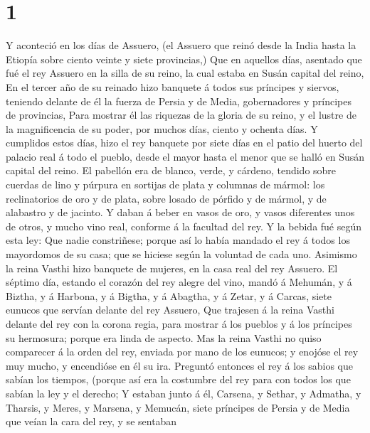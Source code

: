 \hypertarget{section}{%
\section{1}\label{section}}

 Y aconteció en los días de Assuero, (el Assuero que reinó
desde la India hasta la Etiopía sobre ciento veinte y siete provincias,)
 Que en aquellos días, asentado que fué el rey Assuero en la
silla de su reino, la cual estaba en Susán capital del reino,
 En el tercer año de su reinado hizo banquete á todos sus
príncipes y siervos, teniendo delante de él la fuerza de Persia y de
Media, gobernadores y príncipes de provincias,  Para mostrar
él las riquezas de la gloria de su reino, y el lustre de la
magnificencia de su poder, por muchos días, ciento y ochenta días.
 Y cumplidos estos días, hizo el rey banquete por siete días
en el patio del huerto del palacio real á todo el pueblo, desde el mayor
hasta el menor que se halló en Susán capital del reino.  El
pabellón era de blanco, verde, y cárdeno, tendido sobre cuerdas de lino
y púrpura en sortijas de plata y columnas de mármol: los reclinatorios
de oro y de plata, sobre losado de pórfido y de mármol, y de alabastro y
de jacinto.  Y daban á beber en vasos de oro, y vasos
diferentes unos de otros, y mucho vino real, conforme á la facultad del
rey.  Y la bebida fué según esta ley: Que nadie constriñese;
porque así lo había mandado el rey á todos los mayordomos de su casa;
que se hiciese según la voluntad de cada uno.  Asimismo la
reina Vasthi hizo banquete de mujeres, en la casa real del rey Assuero.
 El séptimo día, estando el corazón del rey alegre del
vino, mandó á Mehumán, y á Biztha, y á Harbona, y á Bigtha, y á Abagtha,
y á Zetar, y á Carcas, siete eunucos que servían delante del rey
Assuero,  Que trajesen á la reina Vasthi delante del rey
con la corona regia, para mostrar á los pueblos y á los príncipes su
hermosura; porque era linda de aspecto.  Mas la reina
Vasthi no quiso comparecer á la orden del rey, enviada por mano de los
eunucos; y enojóse el rey muy mucho, y encendióse en él su ira.
 Preguntó entonces el rey á los sabios que sabían los
tiempos, (porque así era la costumbre del rey para con todos los que
sabían la ley y el derecho;  Y estaban junto á él, Carsena,
y Sethar, y Admatha, y Tharsis, y Meres, y Marsena, y Memucán, siete
príncipes de Persia y de Media que veían la cara del rey, y se sentaban

